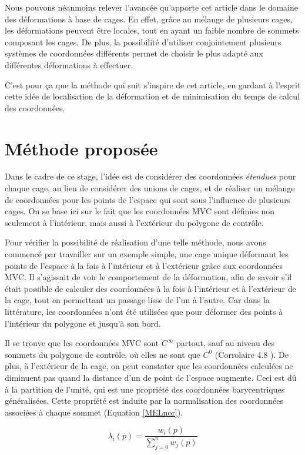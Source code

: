 Nous pouvons néanmoins relever l'avancée qu'apporte cet article dans
le domaine des déformations à base de cages. En effet, grâce au
mélange de plusieurs cages, les déformations peuvent être locales,
tout en ayant un faible nombre de sommets composant les cages. De
plus, la possibilité d'utiliser conjointement plusieurs systèmes de
coordonnées différents permet de choisir le plus adapté aux
différentes déformations à effectuer.

C'est pour ça que la méthode qui suit s'inspire de cet article, en
gardant à l'esprit cette idée de localisation de la déformation et de
minimisation du temps de calcul des coordonnées.

\section{Méthode proposée}
Dans le cadre de ce stage, l'idée est de considérer des coordonnées
\textit{étendues} pour chaque cage, au lieu de considérer des unions
de cages, et de réaliser un mélange de coordonnées pour les points de
l'espace qui sont sous l'influence de plusieurs cages. On se base ici
sur le fait que les coordonnées MVC sont définies non seulement à
l'intérieur, mais aussi à l'extérieur du polygone de contrôle.

Pour vérifier la possibilité de réalisation d'une telle méthode, nous
avons commencé par travailler sur un exemple simple, une cage unique
déformant les points de l'espace à la fois à l'intérieur et à
l'extérieur grâce aux coordonnées MVC. Il s'agissait de voir le
comportement de la déformation, afin de savoir s'il était possible de
calculer des coordonnées à la fois à l'intérieur et à l'extérieur de
la cage, tout en permettant un passage lisse de l'un à l'autre. Car
dans la littérature, les coordonnées n'ont été utilisées que pour
déformer des points à l'intérieur du polygone et jusqu'à son bord.

Il se trouve que les coordonnées MVC sont $C^\infty$ partout, sauf au
niveau des sommets du polygone de contrôle, où elles ne sont que $C^0$
(Corrolaire 4.8 \cite{HF06}). De plus, à l'extérieur de la cage, on
peut constater que les coordonnées calculées ne diminuent pas quand la
distance d'un de point de l'espace augmente. Ceci est dû à la
partition de l'unité, qui est une propriété des coordonnées
barycentriques généralisées. Cette propriété est induite par la
normalisation des coordonnées associées à chaque sommet (Equation
\ref{MELnor}).

\begin{equation}
  \lambda_i(p) = \frac{w_i(p)}{\sum_{j=0}^n w_j(p)}
  \label{MELnor}
\end{equation}

